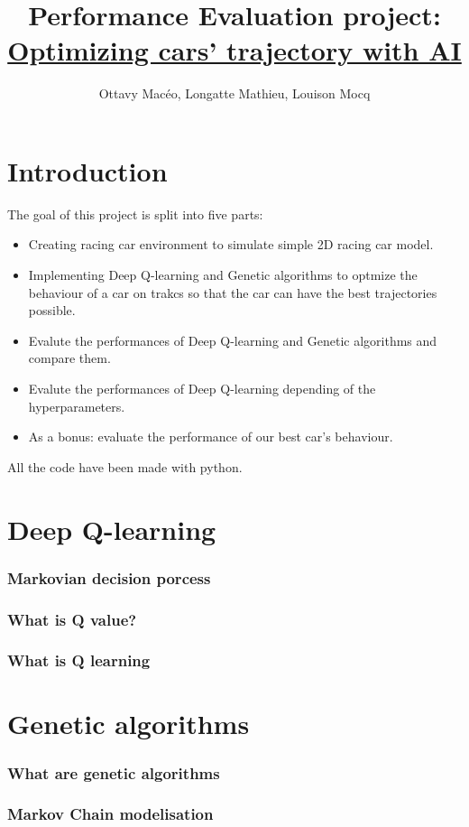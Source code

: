 \documentclass[11pt,a4paper]{article}
\title{\vspace{-1.0cm}Performance Evaluation project:\\\underline{Optimizing cars' trajectory with AI}}
\date{}
\author{\vspace{-1cm}Ottavy Macéo, Longatte Mathieu, Louison Mocq}
\newcommand{\mlist}[1]{\begin{itemize}[noitemsep,topsep=0pt]#1\end{itemize}}
\begin{document}
\maketitle

	\part{Introduction}
The goal of this project is split into five parts:
\mlist{
\item Creating racing car environment to simulate simple 2D racing car model.
\item Implementing Deep Q-learning and Genetic algorithms to optmize the behaviour of a car on trakcs so that the car can have the best trajectories possible.
\item Evalute the performances of Deep Q-learning and Genetic algorithms and compare them.
\item Evalute the performances of Deep Q-learning depending of the hyperparameters.
\item As a bonus: evaluate the performance of our best car's behaviour.
}
All the code have been made with python.

	\part{Deep Q-learning}
		\section{Markovian decision porcess}
		
		\section{What is Q value?}
		
		\section{What is Q learning}

	
	\part{Genetic algorithms}
		\section{What are genetic algorithms}
		
		\section{Markov Chain modelisation}
		
\end{document}
